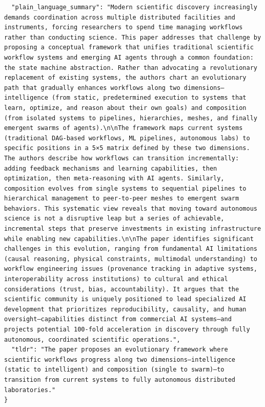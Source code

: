 \documentclass[11pt]{article}
\begin{document}
\begin{verbatim}
  "plain_language_summary": "Modern scientific discovery increasingly demands coordination across multiple distributed facilities and instruments, forcing researchers to spend time managing workflows rather than conducting science. This paper addresses that challenge by proposing a conceptual framework that unifies traditional scientific workflow systems and emerging AI agents through a common foundation: the state machine abstraction. Rather than advocating a revolutionary replacement of existing systems, the authors chart an evolutionary path that gradually enhances workflows along two dimensions—intelligence (from static, predetermined execution to systems that learn, optimize, and reason about their own goals) and composition (from isolated systems to pipelines, hierarchies, meshes, and finally emergent swarms of agents).\n\nThe framework maps current systems (traditional DAG-based workflows, ML pipelines, autonomous labs) to specific positions in a 5×5 matrix defined by these two dimensions. The authors describe how workflows can transition incrementally: adding feedback mechanisms and learning capabilities, then optimization, then meta-reasoning with AI agents. Similarly, composition evolves from single systems to sequential pipelines to hierarchical management to peer-to-peer meshes to emergent swarm behaviors. This systematic view reveals that moving toward autonomous science is not a disruptive leap but a series of achievable, incremental steps that preserve investments in existing infrastructure while enabling new capabilities.\n\nThe paper identifies significant challenges in this evolution, ranging from fundamental AI limitations (causal reasoning, physical constraints, multimodal understanding) to workflow engineering issues (provenance tracking in adaptive systems, interoperability across institutions) to cultural and ethical considerations (trust, bias, accountability). It argues that the scientific community is uniquely positioned to lead specialized AI development that prioritizes reproducibility, causality, and human oversight—capabilities distinct from commercial AI systems—and projects potential 100-fold acceleration in discovery through fully autonomous, coordinated scientific operations.",
  "tldr": "The paper proposes an evolutionary framework where scientific workflows progress along two dimensions—intelligence (static to intelligent) and composition (single to swarm)—to transition from current systems to fully autonomous distributed laboratories."
}
\end{verbatim}
\end{document}
